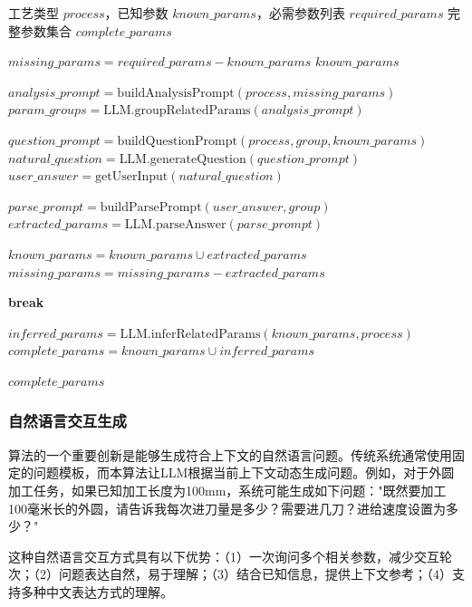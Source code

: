 \documentclass[preprint,12pt]{elsarticle}
\begin{document}
\begin{algorithm}[htbp]
\caption{LLM驱动的智能参数补全算法}
\label{alg:param-completion}
\begin{algorithmic}[1]
\Require 工艺类型 $process$，已知参数 $known\_params$，必需参数列表 $required\_params$
\Ensure 完整参数集合 $complete\_params$

\State $missing\_params = required\_params - known\_params$
    \Return $known\_params$
\EndIf

\State $analysis\_prompt = \text{buildAnalysisPrompt}(process, missing\_params)$
\State $param\_groups = \text{LLM.groupRelatedParams}(analysis\_prompt)$

    \State $question\_prompt = \text{buildQuestionPrompt}(process, group, known\_params)$
    \State $natural\_question = \text{LLM.generateQuestion}(question\_prompt)$
    \State $user\_answer = \text{getUserInput}(natural\_question)$
    
    \State $parse\_prompt = \text{buildParsePrompt}(user\_answer, group)$
    \State $extracted\_params = \text{LLM.parseAnswer}(parse\_prompt)$
    
    \State $known\_params = known\_params \cup extracted\_params$
    \State $missing\_params = missing\_params - extracted\_params$
    
        \State \textbf{break}
    \EndIf
\EndFor

\State $inferred\_params = \text{LLM.inferRelatedParams}(known\_params, process)$
\State $complete\_params = known\_params \cup inferred\_params$

\Return $complete\_params$
\end{algorithmic}
\end{algorithm}

\subsubsection{自然语言交互生成}

算法的一个重要创新是能够生成符合上下文的自然语言问题。传统系统通常使用固定的问题模板，而本算法让LLM根据当前上下文动态生成问题。例如，对于外圆加工任务，如果已知加工长度为100mm，系统可能生成如下问题："既然要加工100毫米长的外圆，请告诉我每次进刀量是多少？需要进几刀？进给速度设置为多少？"

这种自然语言交互方式具有以下优势：（1）一次询问多个相关参数，减少交互轮次；（2）问题表达自然，易于理解；（3）结合已知信息，提供上下文参考；（4）支持多种中文表达方式的理解。
\end{document}
